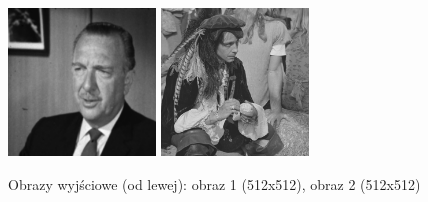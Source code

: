 \documentclass[final,a4paper,openany,12pt]{mwbk}
\begin{document}
\begin{figure}[H]
	\begin{center}
		\includegraphics[width=0.35\textwidth]{gentelman_gray_unificationRas_result}
		\includegraphics[width=0.35\textwidth]{pirate_gray_unificationRas_result}
	\end{center}
	\caption{Obrazy wyjściowe (od lewej): obraz 1 (512x512), obraz 2 (512x512)}
\end{figure}

\end{document}
